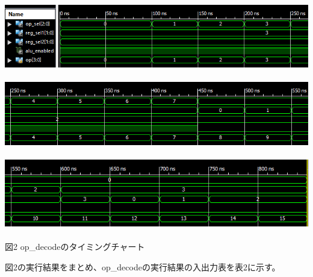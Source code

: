 \documentclass[12pt]{jreport}
\begin{document}
        \begin{center}
            \includegraphics[width=18cm]{op_decode_1.png} \\　\\
            \includegraphics[width=18cm]{op_decode_2.png} \\　\\
            \includegraphics[width=18cm]{op_decode_3.png} \\　\\
                図2 op\_decodeのタイミングチャート
        \end{center} 
        \newpage

        図2の実行結果をまとめ、op\_decodeの実行結果の入出力表を表2に示す。
\end{document}
